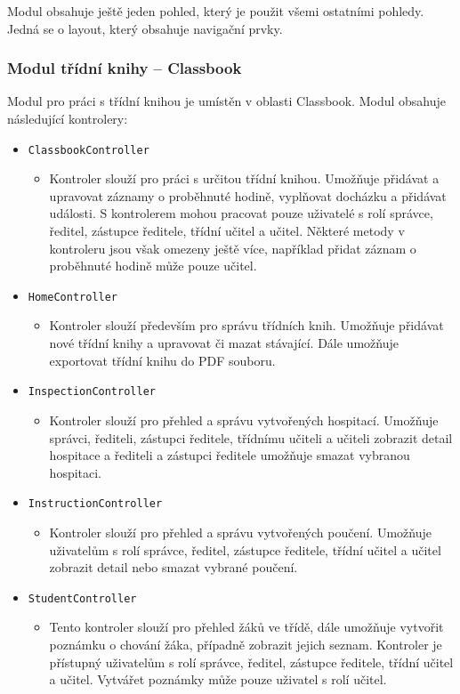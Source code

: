 Modul obsahuje ještě jeden pohled, který je použit všemi ostatními pohledy. Jedná se o layout, který obsahuje navigační prvky.

\subsubsection{Modul třídní knihy -- Classbook}
Modul pro práci s třídní knihou je umístěn v oblasti Classbook. Modul obsahuje následující kontrolery:
\begin{itemize}
    \item \texttt{ClassbookController}
    \begin{itemize}
        \item Kontroler slouží pro práci s určitou třídní knihou. Umožňuje přidávat a upravovat záznamy o proběhnuté hodině, vyplňovat docházku a přidávat události. S kontrolerem mohou pracovat pouze uživatelé s rolí správce, ředitel, zástupce ředitele, třídní učitel a učitel. Některé metody v kontroleru jsou však omezeny ještě více, například přidat záznam o proběhnuté hodině může pouze učitel.
    \end{itemize}
    
    \item \texttt{HomeController}
    \begin{itemize}
        \item Kontroler slouží především pro správu třídních knih. Umožňuje přidávat nové třídní knihy a upravovat či mazat stávající. Dále umožňuje exportovat třídní knihu do PDF souboru.
    \end{itemize}
    
    \item \texttt{InspectionController}
    \begin{itemize}
        \item Kontroler slouží pro přehled a správu vytvořených hospitací. Umožňuje správci, řediteli, zástupci ředitele, třídnímu učiteli a učiteli zobrazit detail hospitace a řediteli a zástupci ředitele umožňuje smazat vybranou hospitaci.
    \end{itemize}
    
    \item \texttt{InstructionController}
    \begin{itemize}
        \item Kontroler slouží pro přehled a správu vytvořených poučení. Umožňuje uživatelům s rolí správce, ředitel, zástupce ředitele, třídní učitel a učitel zobrazit detail nebo smazat vybrané poučení.
    \end{itemize}
    
    \item \texttt{StudentController}
    \begin{itemize}
        \item Tento kontroler slouží pro přehled žáků ve třídě, dále umožňuje vytvořit poznámku o chování žáka, případně zobrazit jejich seznam. Kontroler je přístupný uživatelům s rolí správce, ředitel, zástupce ředitele, třídní učitel a učitel. Vytvářet poznámky může pouze uživatel s rolí učitel.
    \end{itemize}
\end{itemize}

